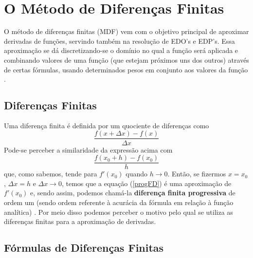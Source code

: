 \chapter{O Método de Diferenças Finitas}

    \label{cap:MDF}
    
    O método de diferenças finitas (MDF) vem com o objetivo principal de aproximar derivadas
    de funções, servindo também na resolução de EDO's e EDP's. Essa aproximação se dá discretizando-se o domínio no qual a função será aplicada e combinando valores de uma função (que estejam próximos uns dos outros) através de certas fórmulas,
    usando determinados pesos em conjunto aos valores da função \cite{scholarMDF}.

    \section{Diferenças Finitas}
    
        Uma diferença finita é definida por um quociente de diferenças como
        \begin{equation}
            \label{progFD}
            \dfrac{f(x + \Delta x) - f(x)}{\Delta x}
        \end{equation}
        Pode-se perceber a similaridade da expressão acima com
        \begin{equation}
            \dfrac{f(x_0 + h) - f(x_0)}{h}
        \end{equation}
        que, como sabemos, tende para $f'(x_0)$ quando $h \xrightarrow{} 0$. Então, se fizermos
        $x = x_0$, $\Delta x = h$ e $\Delta x \xrightarrow{} 0$, temos que a equação (\ref{progFD}) é uma 
        aproximação de $f'(x_0)$ e, sendo assim, podemos chamá-la \textbf{diferença finita progressiva} de 
        ordem um (sendo ordem referente à acurácia da fórmula em relação à função analítica) \cite{CalcNumUFGRS}. 
        Por meio disso podemos perceber o motivo pelo qual se utiliza as diferenças finitas para a aproximação de derivadas.
    
    \section{Fórmulas de Diferenças Finitas}
    

